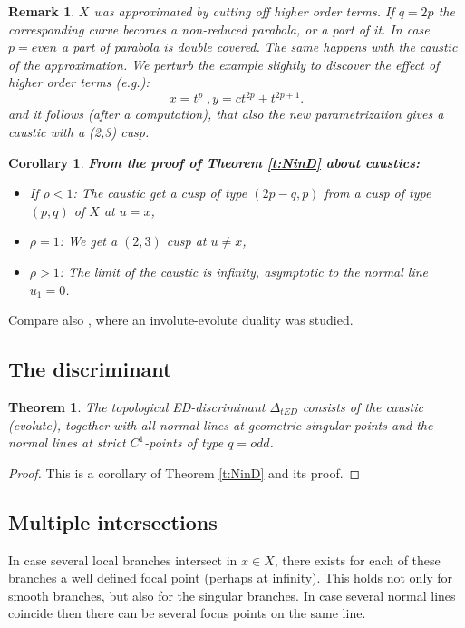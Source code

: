 \documentclass[12pt,a4,twoside]{amsart}
\newtheorem{theorem}{Theorem}
\newtheorem{cor}{Corollary}
\newtheorem*{main lemma}{The main lemma}
\newtheorem*{remark}{Remark}
\begin{document}
\begin{remark}\label{r:even-even}
$X$ was approximated by cutting off higher order terms. If $q=2p$ the corresponding curve becomes  a non-reduced parabola, or a part of it.  In case $ p= even$ a part of parabola is double covered. The same happens with the caustic of the approximation. 
We perturb the example slightly to discover the effect of higher order terms (e.g.):
$$ x = t^p  \; , y=  c t^{2p} + t^{2p+1}.$$
and it follows (after a computation), that also the new parametrization gives a caustic with  a (2,3) cusp.


\end{remark}



\begin{cor}
{\bf  From the proof of Theorem \ref{t:NinD} about caustics:}
\begin{itemize}
\item If $\rho < 1$: The caustic get a cusp of type $(2p-q, p)$ from a cusp of type $(p,q)$ of $X$ at $u=x$,
\item  $\rho = 1$:  We get a   $(2,3) $ cusp at $u \ne x$,
\item  $\rho >1$:   The limit of the caustic is infinity, asymptotic to the normal line $u_1=0$.
\end{itemize}
\end{cor}
Compare also \cite{Zhang-Pei}, where an involute-evolute duality was studied.





\subsection{The discriminant}
\begin{theorem}\label{t:top-discr}
The topological ED-discriminant $\Delta_{tED}$ consists of the caustic (evolute), together with all normal lines at  geometric singular points  and the normal lines at strict $C^1$-points of type $q= odd$. 

\end{theorem}
\begin{proof}
This is a corollary of Theorem \ref{t:NinD} and its proof.
\end{proof}

\subsection{Multiple intersections}
In case several local branches intersect in $x \in X$, there exists  for  each of these branches a well defined focal point (perhaps at infinity). This holds not only for smooth branches, but also for the singular branches. In case several normal lines coincide then there can be several focus points on the same line.
\end{document}
